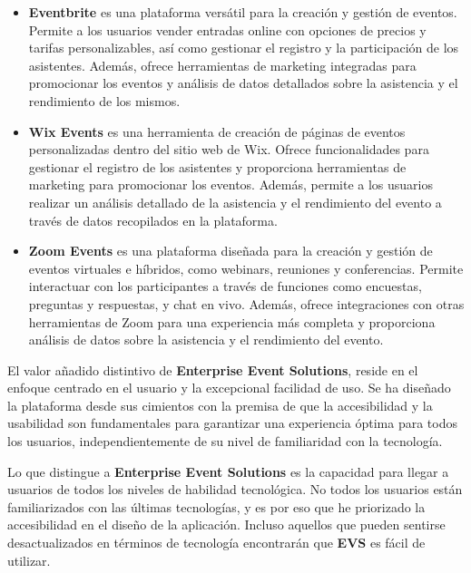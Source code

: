 \begin{itemize}
    \item \textbf{Eventbrite} es una plataforma versátil para la creación y gestión de eventos. Permite a los usuarios vender entradas online 
    con opciones de precios y tarifas personalizables, así como gestionar el registro y la participación de los asistentes. Además, 
    ofrece herramientas de marketing integradas para promocionar los eventos y análisis de datos detallados sobre la asistencia y 
    el rendimiento de los mismos.
    \item \textbf{Wix Events} es una herramienta de creación de páginas de 
    eventos personalizadas dentro del sitio web de Wix. Ofrece funcionalidades para gestionar el registro de los asistentes y 
    proporciona herramientas de marketing para promocionar los eventos. Además, permite a los usuarios realizar un análisis 
    detallado de la asistencia y el rendimiento del evento a través de datos recopilados en la plataforma.
    \item \textbf{Zoom Events} es una plataforma diseñada para la creación y gestión de eventos virtuales e híbridos, como webinars, 
    reuniones y conferencias. Permite interactuar con los participantes a través de funciones como encuestas, preguntas y respuestas, 
    y chat en vivo. Además, ofrece integraciones con otras herramientas de Zoom para una experiencia más completa y proporciona análisis 
    de datos sobre la asistencia y el rendimiento del evento.
\end{itemize}

El valor añadido distintivo de \textbf{Enterprise Event Solutions}, reside en el enfoque centrado en el usuario y la excepcional 
facilidad de uso. Se ha diseñado la plataforma desde sus cimientos con la premisa de que la accesibilidad y la usabilidad son fundamentales 
para garantizar una experiencia óptima para todos los usuarios, independientemente de su nivel de familiaridad con la tecnología.

Lo que distingue a \textbf{Enterprise Event Solutions} es la capacidad para llegar a usuarios de todos los niveles de habilidad tecnológica. 
No todos los usuarios están familiarizados con las últimas tecnologías, y es por eso que he priorizado la accesibilidad en el diseño de la aplicación. Incluso aquellos que
pueden sentirse desactualizados en términos de tecnología encontrarán que \textbf{EVS} es fácil de utilizar.


